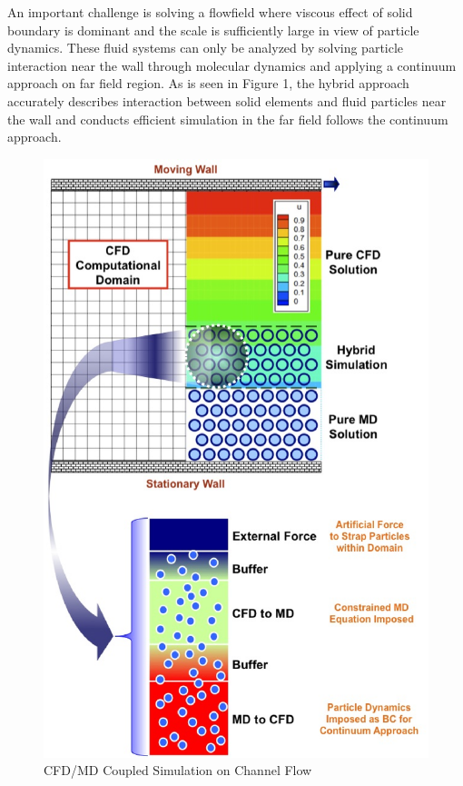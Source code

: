 \documentclass[conference,final]{IEEEtran}
\begin{document}
An important challenge is solving a flowfield where viscous effect of solid boundary is dominant and the scale is sufficiently large in view of particle dynamics. These fluid systems can only be analyzed by solving particle interaction near the wall through molecular dynamics and applying a continuum approach on far field region. As is seen in Figure 1, the hybrid approach accurately describes interaction between solid elements and fluid particles near the wall and conducts efficient simulation in the far field follows the continuum approach.

\begin{figure}
\centering
\includegraphics[scale=0.45]{fig1.eps}
\caption{CFD/MD Coupled Simulation on Channel Flow}
\end{figure}
\end{document}
